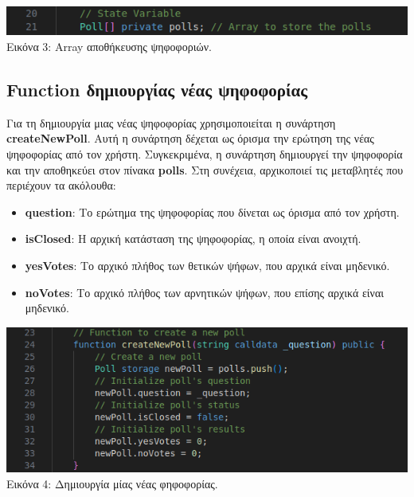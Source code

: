 \documentclass[12pt]{article}
\begin{document}
    \begin{center}
        \includegraphics[width=\linewidth]{images/code_poll_state.png}
        Εικόνα 3: Array αποθήκευσης ψηφοφοριών.
    \end{center}
    
    \subsection{Function δημιουργίας νέας ψηφοφορίας}
        Για τη δημιουργία μιας νέας ψηφοφορίας χρησιμοποιείται η συνάρτηση \textbf{createNewPoll}. Αυτή η συνάρτηση δέχεται ως όρισμα την ερώτηση της νέας ψηφοφορίας από τον χρήστη. Συγκεκριμένα, η συνάρτηση δημιουργεί την ψηφοφορία και την αποθηκεύει στον πίνακα \textbf{polls}. Στη συνέχεια, αρχικοποιεί τις μεταβλητές που περιέχουν τα ακόλουθα:
        \begin{itemize}
            \item \textbf{question}: Το ερώτημα της ψηφοφορίας που δίνεται ως όρισμα από τον χρήστη.
            \item \textbf{isClosed}: Η αρχική κατάσταση της ψηφοφορίας, η οποία είναι ανοιχτή.
            \item \textbf{yesVotes}: Το αρχικό πλήθος των θετικών ψήφων, που αρχικά είναι μηδενικό.
            \item \textbf{noVotes}: Το αρχικό πλήθος των αρνητικών ψήφων, που επίσης αρχικά είναι μηδενικό.
        \end{itemize}
    
    \begin{center}
        \includegraphics[width=\linewidth, keepaspectratio]{images/code_create_new_poll.png}
        Εικόνα 4: Δημιουργία μίας νέας φηφοφορίας.
    \end{center}
    
\end{document}
